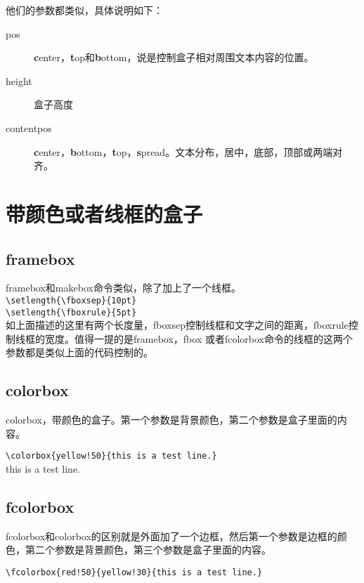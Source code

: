 \documentclass[11pt,oneside]{book}
\begin{document}
        他们的参数都类似，具体说明如下：
        \begin{description}
        \item[pos] \textbf{c}enter，\textbf{t}op和\textbf{b}ottom，说是控制盒子相对周围文本内容的位置。
        \item[height] 盒子高度
        \item[contentpos] \textbf{c}enter，\textbf{b}ottom，\textbf{t}op，\textbf{s}pread。文本分布，居中，底部，顶部或两端对齐。
        \end{description}


        \section{带颜色或者线框的盒子}
        \subsection{framebox}
        framebox和makebox命令类似，除了加上了一个线框。\\
        \verb+\setlength{\fboxsep}{10pt}+\\
        \verb+\setlength{\fboxrule}{5pt}+\\
        如上面描述的这里有两个长度量，fboxsep控制线框和文字之间的距离，fboxrule控制线框的宽度。值得一提的是framebox，fbox 或者fcolorbox命令的线框的这两个参数都是类似上面的代码控制的。


        \subsection{colorbox}
        colorbox，带颜色的盒子。第一个参数是背景颜色，第二个参数是盒子里面的内容。

        \verb+\colorbox{yellow!50}{this is a test line.}+\\
        \colorbox{yellow!50}{this is a test line.}

        \subsection{fcolorbox}
        fcolorbox和colorbox的区别就是外面加了一个边框，然后第一个参数是边框的颜色，第二个参数是背景颜色，第三个参数是盒子里面的内容。

        \verb+\fcolorbox{red!50}{yellow!30}{this is a test line.}+\\
\end{document}
